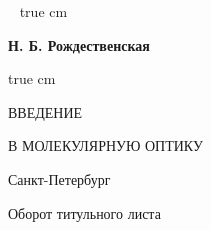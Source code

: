 
\pagestyle{empty}
\  true cm
\centerline{\bfseries Н. Б. Рождественская}
 true cm
\begin{center}
{\LARGE ВВЕДЕНИЕ} 
\end{center}
\begin{center}
{\LARGE В МОЛЕКУЛЯРНУЮ ОПТИКУ}
\end{center}

\vfill
\begin{center}Санкт-Петербург
\end{center}
\newpage
\vfil
{\Large Оборот титульного листа}
\newpage
